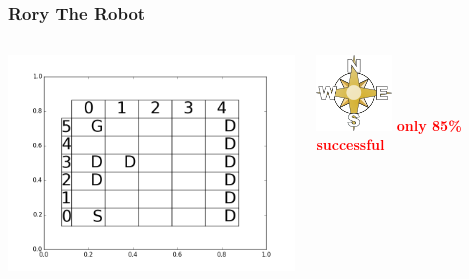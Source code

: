 \documentclass{beamer}
\begin{document}
\begin{frame}
	\frametitle{Rory The Robot}
  \begin{columns}[c]
	     \includegraphics[width=8.5cm]{Images/boardrory}
	     \begin{center}
		   \includegraphics[width=2cm]{Images/compass} \newline \newline \newline
		   \pause
		   \huge{\textbf{\textcolor{red}{only 85\% successful}}}
	     \end{center}
  \end{columns}
\end{frame}
\end{document}

